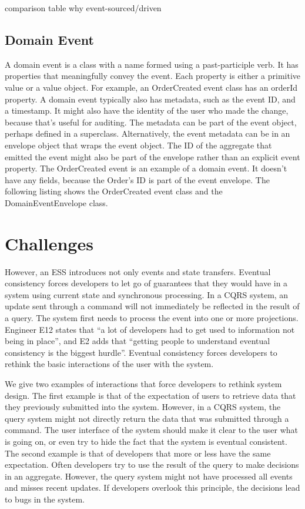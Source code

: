 comparison table why event-sourced/driven \citep{richards2015software}


\subsection{Domain Event}

A domain event is a class with a name formed using a past-participle verb. It has properties that meaningfully convey the event. Each property is either a primitive value or a
value object. For example, an OrderCreated event class has an orderId property.
 A domain event typically also has metadata, such as the event ID, and a timestamp.
It might also have the identity of the user who made the change, because that’s useful
for auditing. The metadata can be part of the event object, perhaps defined in a
superclass. Alternatively, the event metadata can be in an envelope object that wraps
the event object. The ID of the aggregate that emitted the event might also be part of
the envelope rather than an explicit event property.
 The OrderCreated event is an example of a domain event. It doesn’t have any
fields, because the Order’s ID is part of the event envelope. The following listing
shows the OrderCreated event class and the DomainEventEnvelope class.~\citep{richardson2018microservices}

\section{Challenges}

However, an ESS introduces not only events and state transfers. Eventual consistency forces developers to let go of guarantees that they would have in a system using current state and synchronous processing. In a CQRS system, an update sent through a command will not immediately be reflected in the result of a query. The system first needs to process the event into one or more projections. Engineer E12 states that “a lot of developers had to get used to information not being in place”, and E2 adds that “getting people to understand eventual consistency is the biggest hurdle”. Eventual consistency forces developers to rethink the basic interactions of the user with the system.

We give two examples of interactions that force developers to rethink system design. The first example is that of the expectation of users to retrieve data that they previously submitted into the system. However, in a CQRS system, the query system might not directly return the data that was submitted through a command. The user interface of the system should make it clear to the user what is going on, or even try to hide the fact that the system is eventual consistent. The second example is that of developers that more or less have the same expectation. Often developers try to use the result of the query to make decisions in an aggregate. However, the query system might not have processed all events and misses recent updates. If developers overlook this principle, the decisions lead to bugs in the system.

